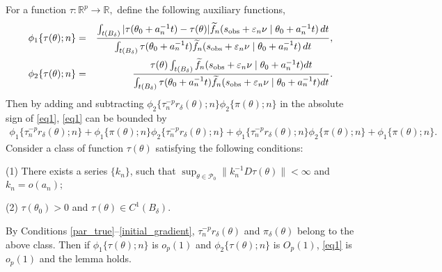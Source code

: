 \documentclass{article}
\begin{document}
	For a function $\tau:\mathbb{R}^{p}\rightarrow\mathbb{R},$ define
	the following auxiliary functions,
	\begin{eqnarray*}
		\phi_{1}\{\tau(\theta);n\} & = & \frac{\int_{t(B_{\delta})}|\tau(\theta_0+a_{n}^{-1}t)-\tau(\theta)|\widetilde{f}_{n}(s_{{\rm obs}}+\varepsilon_{n}\nu\mid\theta_0+a_{n}^{-1}t)\,dt}{\int_{t(B_{\delta})}\tau(\theta_0+a_{n}^{-1}t)\widetilde{f}_{n}(s_{{\rm obs}}+\varepsilon_{n}\nu\mid\theta_0+a_{n}^{-1}t)\,dt},\\
		\phi_{2}\{\tau(\theta);n\} & = & \frac{\tau(\theta)\int_{t(B_{\delta})}\widetilde{f}_{n}(s_{{\rm obs}}+\varepsilon_{n}\nu\mid\theta_0+a_{n}^{-1}t)dt}{\int_{t(B_{\delta})}\tau(\theta_0+a_{n}^{-1}t)\widetilde{f}_{n}(s_{{\rm obs}}+\varepsilon_{n}\nu\mid\theta_{0}+a_{n}^{-1}t)dt}.
	\end{eqnarray*}
	Then by adding and subtracting $\phi_{2}\{\tau_{n}^{-p}r_{\delta}(\theta);n\}\phi_{2}\{\pi(\theta);n\}$
	in the absolute sign of \eqref{eq1}, \eqref{eq1} can be bounded
	by 
	\begin{eqnarray*}
		\phi_{1}\{\tau_{n}^{-p}r_{\delta}(\theta);n\}+\phi_{1}\{\pi(\theta);n\}\phi_{2}\{\tau_{n}^{-p}r_{\delta}(\theta);n\}+\phi_{1}\{\tau_{n}^{-p}r_{\delta}(\theta);n\}\phi_{2}\{\pi(\theta);n\}+\phi_{1}\{\pi(\theta);n\}.
	\end{eqnarray*}
	Consider a class of function $\tau(\theta)$ satisfying the following
	conditions: 
	
	(1) There exists a series $\{k_{n}\}$, such that $\sup_{\theta\in\mathcal{P}_{0}}\|k_{n}^{-1}D\tau(\theta)\|<\infty$
	and $k_{n}=o(a_{n});$ 
	
    (2)	$\tau(\theta_{0})>0$ and $\tau(\theta)\in C^{1}(B_{\delta}).$ 
	
	
	By Conditions \ref{par_true}--\ref{initial_gradient}, $\tau_{n}^{-p}r_{\delta}(\theta)$
	and $\pi_{\delta}(\theta)$ belong to the above class. Then if $\phi_{1}\{\tau(\theta);n\}$
	is $o_{p}(1)$ and $\phi_{2}\{\tau(\theta);n\}$ is $O_{p}(1)$, \eqref{eq1}
	is $o_{p}(1)$ and the lemma holds. 
	
\end{document}
